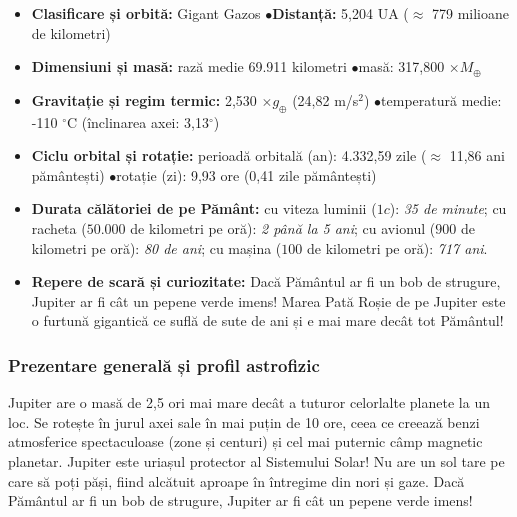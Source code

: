\begin{tcolorbox}[orbitardata, title={\textbf{Repere esențiale: Jupiter}}]
\small
\begin{itemize}[leftmargin=1.4em, itemsep=2pt, topsep=2pt]
  \item \textbf{Clasificare și orbită:} Gigant Gazos \quad$\bullet$\quad \textbf{Distanță:} 5,204 UA ($\approx$ 779 milioane de kilometri)
  \item \textbf{Dimensiuni și masă:} rază medie 69.911 kilometri \quad$\bullet$\quad masă: 317,800 $\times M_\oplus$
  \item \textbf{Gravitație și regim termic:} 2,530 $\times g_\oplus$ (24,82 m/s$^2$) \quad$\bullet$\quad temperatură medie: -110 $^\circ$C (înclinarea axei: 3,13$^\circ$)
  \item \textbf{Ciclu orbital și rotație:} perioadă orbitală (an): 4.332,59 zile ($\approx$ 11,86 ani pământești) \quad$\bullet$\quad rotație (zi): 9,93 ore (0,41 zile pământești)
  \item \textbf{Durata călătoriei de pe Pământ:} cu viteza luminii ($1c$): \emph{35 de minute}; cu racheta ($50.000$ de kilometri pe oră): \emph{2 până la 5 ani}; cu avionul ($900$ de kilometri pe oră): \emph{80 de ani}; cu mașina ($100$ de kilometri pe oră): \emph{717 ani}.
  \item \textbf{Repere de scară și curiozitate:} Dacă Pământul ar fi un bob de strugure, Jupiter ar fi cât un pepene verde imens! Marea Pată Roșie de pe Jupiter este o furtună gigantică ce suflă de sute de ani și e mai mare decât tot Pământul!
\end{itemize}
\end{tcolorbox}

\subsubsection*{Prezentare generală și profil astrofizic}
Jupiter are o masă de 2,5 ori mai mare decât a tuturor celorlalte planete la un loc. Se rotește în jurul axei sale în mai puțin de 10 ore, ceea ce creează benzi atmosferice spectaculoase (zone și centuri) și cel mai puternic câmp magnetic planetar. Jupiter este uriașul protector al Sistemului Solar! Nu are un sol tare pe care să poți păși, fiind alcătuit aproape în întregime din nori și gaze. Dacă Pământul ar fi un bob de strugure, Jupiter ar fi cât un pepene verde imens!

